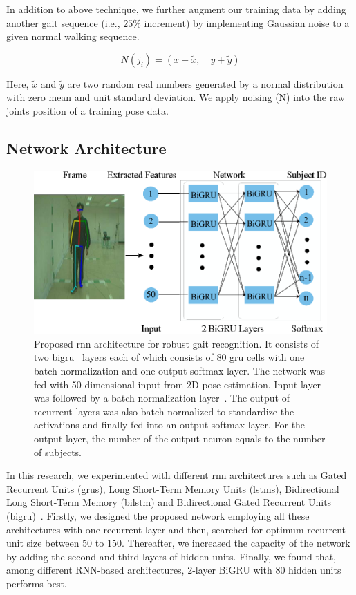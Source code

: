 In addition to above technique, we further augment our training data by adding another gait sequence (i.e., $ 25\% $ increment) by implementing Gaussian noise to a given normal walking sequence. 

\begin{equation}
N(j_i) = (x + \tilde{x},  \quad y+ \tilde{y})
\end{equation}

Here,  $\tilde{x}$ and $\tilde{y}$ are two random real numbers generated by a normal distribution with zero mean and unit standard deviation. We apply noising (N) into the raw joints position of a training pose data.



\subsection{Network Architecture}
\begin{figure}
	\centering 
	\includegraphics[width = 115mm]{figures/rnn_network.eps}
	\caption{
		Proposed \gls{rnn} architecture for robust gait recognition. It consists of two \gls{bigru}~\cite{Schuster_97} layers each of which consists of 80 \gls{gru} cells with one batch normalization and one output softmax layer. The network was fed with 50 dimensional input from 2D pose estimation. Input layer was followed by a batch normalization layer~\cite{Ioffe_15}. The output of recurrent layers was also batch normalized to standardize the activations and finally fed into an output softmax layer. For the output layer, the number of the output neuron equals to the number of subjects.
	}
	\label{fig:rnn_network}
\end{figure}
In this research, we experimented with different \gls{rnn} architectures such as Gated Recurrent Units (\gls{gru}s),  Long Short-Term Memory Units (\gls{lstm}s), Bidirectional Long Short-Term Memory (\gls{bilstm}) and Bidirectional Gated Recurrent Units (\gls{bigru})~\cite{Schuster_97}. Firstly, we designed the proposed network employing all these architectures with one recurrent layer and then, searched for optimum recurrent unit size between 50 to 150. Thereafter, we increased the capacity of the network by adding the second and third layers of hidden units. Finally, we found that, among different RNN-based architectures, 2-layer BiGRU with 80 hidden units performs best. 

